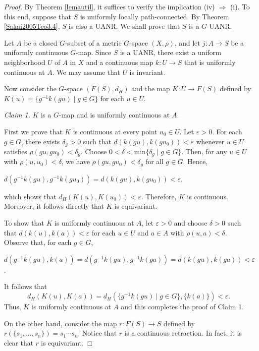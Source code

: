 \documentclass[12pt]{amsart}
\theoremstyle{definition}
\begin{document}
	\begin{proof}
		By Theorem \ref{lemautil}, it suffices to verify the implication (iv) $\Rightarrow$ (i). To this end, suppose that $S$ is uniformly locally path-connected. By Theorem \ref{Sakai2005Teo3.4}, $S$ is also a UANR. We shall prove that $S$ is a $G$-UANR.
		
		Let $A$ be a closed $G$-subset of a metric $G$-space $(X,\rho)$, and let $j:A\rightarrow S$ be a uniformly continuous $G$-map. Since $S$ is a UANR, there exist a uniform neighborhood $U$ of $A$ in $X$ and a continuous map $k: U\rightarrow S$ that is uniformly continuous at $A$. We may assume that $U$ is invariant.
		
		Now consider the $G$-space $(F(S),d_H)$ and the map $K:U\rightarrow F(S)$ defined by $K(u)=\{g^{-1} k(gu)\mid g\in G\}$ for each $u\in U$.
		
		\smallskip
		
		\noindent\textit{Claim 1.} $K$ is a $G$-map and is uniformly continuous at $A$.
		
		First we prove that  $K$ is continuous at every point $u_0\in U$.	Let $\varepsilon>0$. For each $g\in G$, there exists $\delta_g>0$ such that $d(k(gu),k(gu_0))<\varepsilon$ whenever $u \in U$ satisfies $\rho(gu,gu_0)<\delta_g$. Choose $0<\delta<\text{min}\{\delta_g\mid g\in G\}$. Then, for any $u\in U$ with $\rho(u,u_0)<\delta$, we have $\rho(gu, gu_0) < \delta_g$ for all $g \in G$. Hence, 
		\begin{center}
			$d(g^{-1} k(gu),g^{-1} k(gu_0))=d(k(gu),k(gu_0))<\varepsilon$,
		\end{center}
		which shows that $d_H(K(u),K(u_0))<\varepsilon$. Therefore, $K$ is continuous. Moreover, it follows directly that $K$ is equivariant.
		
		To show that $K$ is uniformly continuous at $A$, let $\varepsilon>0$ and choose $\delta>0$ such that $d(k(u),k(a))<\varepsilon$ for each $u\in U$ and $a\in A$ with $\rho(u,a)<\delta$. Observe that, for each $g\in G$,
		\begin{center}
			$d(g^{-1} k(gu),k(a))=d(g^{-1} k(gu),g^{-1} k(ga))=d(k(gu),k(ga))<\varepsilon$.
		\end{center}
		
		It follows that 
		$$d_H(K(u),K(a))=d_H(\{g^{-1} k(gu)\mid g\in G\},\{k(a)\})<\varepsilon.$$
		 Thus, $K$ is uniformly continuous at $A$ and  this completes the proof of Claim 1.
		
		\smallskip
		
		On the other hand, consider the map $r: F(S)\rightarrow S$ defined by $r(\{s_1,\dots,s_n\})=s_1\cdots s_n$. Notice that $r$ is a continuous retraction. In fact, it is clear that $r$ is equivariant.
		

\end{proof}
\end{document}
